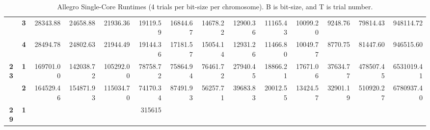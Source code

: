 \begin{table}[h!]
{\begin{tabular}{@{} ccrrrrrrrrrrrr}
\textbf{}   & \textbf{3}                     & 28343.88                         & 24658.88                         & 21936.36                         & 19119.59                         & 16844.67                         & 14678.22                         & 12900.36                         & 11165.43                         & 10099.20                         & 9248.76                          & 79814.43                        & 948114.72                          \\
\textbf{}   & \textbf{4}                     & 28494.78                         & 24802.63                         & 21944.49                         & 19144.36                         & 17181.57                         & 15054.14                         & 12931.26                         & 11466.80                         & 10049.77                         & 8770.75                          & 81447.60                        & 946515.60                          \\
\textbf{23} & \textbf{1}                     & 169701.00                        & 142038.72                        & 105292.00                        & 78758.72                         & 75864.94                         & 76461.72                         & 27940.45                         & 18866.21                         & 17671.06                         & 37634.77                         & 478507.45                       & 6531019.41                         \\
\textbf{}   & \textbf{2}                     & 164529.46                        & 154871.93                        & 115034.70                        & 74170.34                         & 87491.93                         & 56257.71                         & 39683.83                         & 20012.55                         & 13424.57                         & 32901.19                         & 510920.27                       & 6780937.40                         \\
\textbf{29} & \textbf{1}                     &                                  &                                  &                                  & 315615                           &                                  &                                  &                                  &                                  &                                  &                                  &                                 &                                   
\end{tabular}
}
\caption[Allegro Single-Core runtimes, 4 trials per chromosome, per bit-size]{Allegro Single-Core Runtimes (4 trials per bit-size per chromosome). B is bit-size, and T is trial number.}
\end{table}
\thispagestyle{empty}

